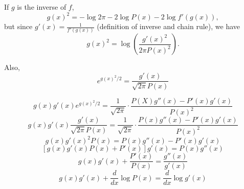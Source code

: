 \documentclass[12pt]{article}
\begin{document}
If $g$ is the inverse of $f$,
$$g(x)^2 = -\log 2 \pi - 2 \log P(x) - 2 \log f'(g(x)),$$
but since $g'(x) = \frac{1}{f'(g(x))}$ (definition of inverse and chain rule), we have
$$g(x)^2 = \log\left(\frac{g'(x)^2}{2 \pi P(x)^2}\right).$$

Also,
$$e^{g(x)^2/2} = \frac{g'(x)}{\sqrt{2\pi}P(x)}$$

$$g(x)g'(x)e^{g(x)^2/2} = \frac{1}{\sqrt{2\pi}}\cdot\frac{P(X)g''(x) - P'(x)g'(x)}{P(x)^2}$$
$$g(x)g'(x)\frac{g'(x)}{\sqrt{2\pi}P(x)} = \frac{1}{\sqrt{2\pi}}\cdot\frac{P(x)g''(x) - P'(x)g'(x)}{P(x)^2}$$
$$g(x)g'(x)^2 P(x) = P(x)g''(x) - P'(x)g'(x)$$
$$[g(x)g'(x) P(x) + P'(x)]g'(x) = P(x)g''(x)$$
$$g(x)g'(x) + \frac{P'(x)}{P(x)} = \frac{g''(x)}{g'(x)}$$
$$g(x)g'(x) + \frac{d}{dx}\log P(x) = \frac{d}{dx}\log g'(x)$$
\end{document}
